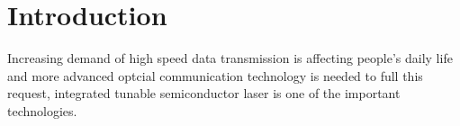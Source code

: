 \chapter{Introduction}
\label{ch:Introduction}







Increasing demand of high speed data transmission is affecting people's daily life and more advanced optcial communication technology is needed to full this request, integrated tunable semiconductor laser is one of the important technologies.




